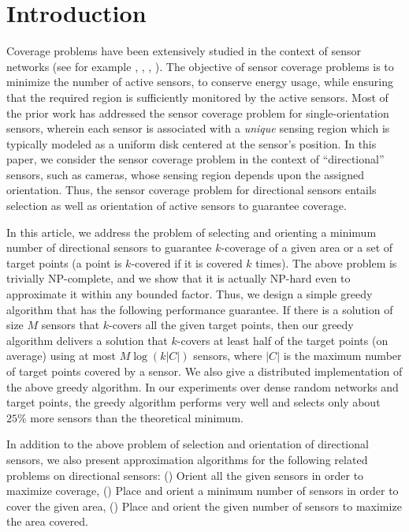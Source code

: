 \documentclass[conference]{IEEEtran}
\theoremstyle{definition}
\newtheorem*{NP-Hardness of Approximating the SODkC Problem}{NP-Hardness of Approximating the SODkC Problem}
\newtheorem*{Greedy Algorithm (GA)}{Greedy Algorithm (GA)}
\newtheorem*{GA on the Running Example}{GA on the Running Example}
\newtheorem*{Performance Guarantee of GA}{Performance Guarantee of GA}
\begin{document}
\section{Introduction}

Coverage problems have been extensively studied in the context of sensor networks (see for example \cite{1597223}, \cite{1146711}, \cite{936985}, \cite{10.1145/381677.381691}). The objective of sensor coverage problems is to minimize the number of active sensors, to conserve energy usage, while ensuring that the required region is sufficiently monitored by the active sensors. Most of the prior work has addressed the sensor coverage problem for single-orientation sensors, wherein each sensor is associated with a \emph{unique} sensing region which is typically modeled as a uniform disk centered at the sensor’s position. In this paper, we consider the sensor coverage problem in the context of “directional” sensors, such as cameras, whose sensing region depends upon the assigned orientation. Thus, the sensor coverage problem for directional sensors entails selection as well as orientation of active sensors to guarantee coverage.

In this article, we address the problem of selecting and orienting a minimum number of directional sensors to guarantee $k$-coverage of a given area or a set of target points (a point is $k$-covered if it is covered $k$ times). The above problem is trivially NP-complete, and we show that it is actually NP-hard even to approximate it within any bounded factor. Thus, we design a simple greedy algorithm that has the following performance guarantee. If there is a solution of size $M$ sensors that $k$-covers all the given target points, then our greedy algorithm delivers a solution that $k$-covers at least half of the target points (on average) using at most $M \log(k|C|)$ sensors, where $|C|$ is the maximum number of target points covered by a sensor. We also give a distributed implementation of the above greedy algorithm. In our experiments over dense random networks and target points, the greedy algorithm performs very well and selects only about $25\%$ more sensors than the theoretical minimum.

In addition to the above problem of selection and orientation of directional sensors, we also present approximation algorithms for the following related problems
on directional sensors: () Orient all the given sensors in order to maximize coverage, () Place and orient a minimum number of sensors in order to cover the given
area, () Place and orient the given number of sensors
to maximize the area covered.
\end{document}
